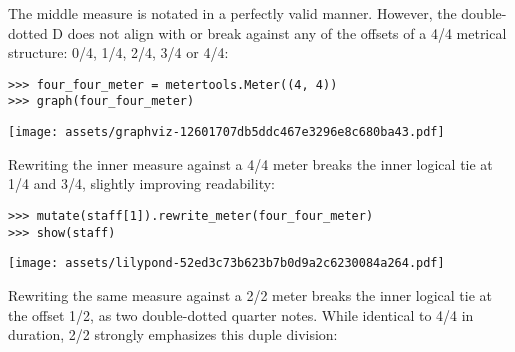 \noindent The middle measure is notated in a perfectly valid manner. However,
the double-dotted D does not align with or break against any of the offsets of
a 4/4 metrical structure: 0/4, 1/4, 2/4, 3/4 or 4/4:

\begin{comment}
<abjad>
four_four_meter = metertools.Meter((4, 4))
graph(four_four_meter)
</abjad>
\end{comment}

\begin{abjadbookoutput}
\begin{singlespacing}
\vspace{-0.5\baselineskip}
\begin{verbatim}
>>> four_four_meter = metertools.Meter((4, 4))
>>> graph(four_four_meter)
\end{verbatim}
\noindent\texttt{[image: assets/graphviz-12601707db5ddc467e3296e8c680ba43.pdf]}
\end{singlespacing}
\end{abjadbookoutput}

\noindent Rewriting the inner measure against a 4/4 meter breaks the inner
logical tie at 1/4 and 3/4, slightly improving readability:

\begin{comment}
<abjad>
mutate(staff[1]).rewrite_meter(four_four_meter)
show(staff)
</abjad>
\end{comment}

\begin{abjadbookoutput}
\begin{singlespacing}
\vspace{-0.5\baselineskip}
\begin{verbatim}
>>> mutate(staff[1]).rewrite_meter(four_four_meter)
>>> show(staff)
\end{verbatim}
\noindent\texttt{[image: assets/lilypond-52ed3c73b623b7b0d9a2c6230084a264.pdf]}
\end{singlespacing}
\end{abjadbookoutput}

\noindent Rewriting the same measure against a 2/2 meter breaks the inner
logical tie at the offset 1/2, as two double-dotted quarter notes. While
identical to 4/4 in duration, 2/2 strongly emphasizes this duple division:

\begin{comment}
<abjad>
two_two_meter = metertools.Meter((2, 2))
staff = Staff(parseable)
mutate(staff[1]).rewrite_meter(two_two_meter)
show(staff)
</abjad>
\end{comment}

